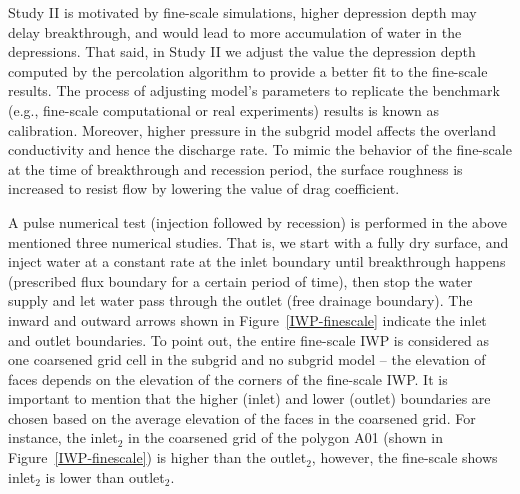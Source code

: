 \documentclass[review,11pt]{elsarticle}
\begin{document}
Study II is motivated by fine-scale simulations, higher depression depth may delay breakthrough, and would lead to more accumulation of water in the depressions. That said, in Study II we adjust the value the depression depth computed by the percolation algorithm to provide a better fit to the fine-scale results. The process of adjusting model's parameters to replicate the benchmark (e.g., fine-scale computational or real experiments) results is known as calibration. Moreover, higher pressure in the subgrid model affects the overland conductivity and hence the discharge rate. To mimic the behavior of the fine-scale at the time of breakthrough and recession period, the surface roughness is increased to resist flow by lowering the value of drag coefficient.

A pulse numerical test (injection followed by recession) is performed in the above mentioned three numerical studies. That is, we start with a fully dry surface, and inject water at a constant rate at the inlet boundary until breakthrough happens (prescribed flux boundary for a certain period of time), then stop the water supply and let water pass through the outlet (free drainage boundary). The inward and outward arrows shown in Figure~\ref{IWP-finescale} indicate the inlet and outlet boundaries. 
To point out, the entire fine-scale IWP is considered as one coarsened grid cell in the subgrid and no subgrid model -- the elevation of faces depends on the elevation of the corners of the fine-scale IWP.  It is important to mention that the higher (inlet) and lower (outlet) boundaries are chosen based on the average elevation of the faces in the coarsened grid. For instance, the inlet$_2$ in the coarsened grid of the polygon A01 (shown in Figure~\ref{IWP-finescale}) is higher than the outlet$_2$, however, the fine-scale shows inlet$_2$ is lower than outlet$_2$. 
\end{document}
